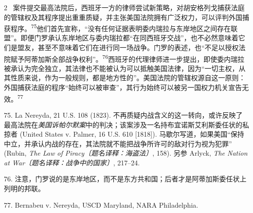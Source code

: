 \documentclass[10pt,a4paper]{article}
\begin{document}
\begin{paracol}{2}
\switchcolumn*
{\scriptsize\color{gray} [p. 18]}\ 案件提交最高法院后，西班牙一方的律师尝试新策略，对胡安格列戈捕获法庭的管辖权及其程序提出重重质疑，并主张美国法院拥有广泛权力，可以评判外国捕获程\mbox{序。\textsuperscript{75}}他们首先宣称，“没有任何证据表明委内瑞拉与东岸地区之间存在联盟”。即便门罗承认东岸地区与委内瑞拉都“在同西班牙交战”，也不必然意味着它们是盟友，甚至不意味着它们在进行同一场战争。门罗的表述，也“不足以授权法院赋予阿蒂加斯全部战争权利”。\nobreak\textsuperscript{76}西班牙的代理律师进一步提出，即使委内瑞拉被承认为完全独立，其法律也不能被认为可以抵触美国法律，因为“一切主权，从其性质来说，作为一般规则，都是地方性的”。美国法院的管辖权源自这一原则：外国捕获法庭的程序“始终可以被审查”，其行为始终可以被另一国权力机关宣告无\mbox{效。\textsuperscript{77}}\par{\small 75. La Nereyda, 21 U.S. 108 (1823). 不再质疑内战含义的这一转向，或许反映了最高法院在\textit{美国诉帕尔默案}中的判决；该案涉及一名持布宜诺斯艾利斯委任状的私掠者 (United States v. Palmer, 16 U.S. 610 [1818]). 马歇尔写道，如果美国“保持中立，并承认内战的存在，其法院就不能把战争所许可的敌对行为视为犯罪” (Rubin, \textit{The Law of Piracy〔题名译释：海盗法〕}, 158). 另参 Arlyck, \textit{The Nation at War〔题名译释：战争中的国家〕}, 217–24.\par}{\small 76. 注意，门罗说的是东岸地区，而不是东方共和国；后者才是阿蒂加斯委任状上列明的邦联。\par}{\small 77. Bernabeu v. Nereyda, USCD Maryland, NARA Philadelphia.\par}
\switchcolumn

\end{paracol}
\end{document}
